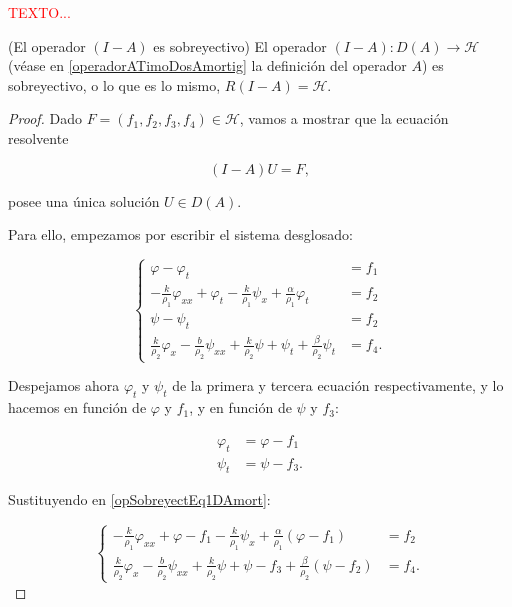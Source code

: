 \textcolor{red}{TEXTO...}

\begin{Proposicion}{(El operador $(I - A)$ es sobreyectivo)}
\label{ch:TimoshenkoFric:prop:ResolventeEsSobreyect}
    El operador $(I-A) : D(A) \rightarrow \mathcal{H}$ (véase en \eqref{operadorATimoDosAmortig} la definición del operador $A$) es sobreyectivo, o lo que es lo mismo, $R(I-A) = \mathcal{H}$.
\end{Proposicion}

\begin{proof}
    Dado $F = (f_1, f_2, f_3, f_4) \in \mathcal{H}$, vamos a mostrar que la ecuación resolvente

    \[(I-A)U = F,\]

    posee una única solución $U \in D(A)$.  

    Para ello, empezamos por escribir el sistema desglosado:

    \begin{equation}
        \label{opSobreyectEq1DAmort}
        \begin{cases}
            \varphi - \varphi_t &= f_1\\
            -\frac{k}{\rho_1}\varphi_{xx} + \varphi_t - \frac{k}{\rho_1}\psi_x + \frac{\alpha}{\rho_1}\varphi_t &= f_2\\
            \psi - \psi_t &= f_2\\
            \frac{k}{\rho_2}\varphi_x - \frac{b}{\rho_2}\psi_{xx} + \frac{k}{\rho_2}\psi + \psi_t + \frac{\beta}{\rho_2}\psi_t &= f_4.
        \end{cases}
    \end{equation}

    Despejamos ahora $\varphi_t$ y $\psi_t$ de la primera y tercera ecuación respectivamente, y lo hacemos en función de $\varphi$ y $f_1$, y en función de $\psi$ y $f_3$:

    \begin{align*}
        \varphi_t &= \varphi - f_1\\
        \psi_t &= \psi - f_3.
    \end{align*}

    Sustituyendo en \eqref{opSobreyectEq1DAmort}:

    \begin{equation*}
        \begin{cases}
            -\frac{k}{\rho_1}\varphi_{xx} + \varphi - f_1 - \frac{k}{\rho_1}\psi_x + \frac{\alpha}{\rho_1}(\varphi - f_1) &= f_2\\
            \frac{k}{\rho_2}\varphi_x - \frac{b}{\rho_2}\psi_{xx} + \frac{k}{\rho_2}\psi + \psi - f_3 + \frac{\beta}{\rho_2}(\psi - f_2) &= f_4.
        \end{cases}
    \end{equation*}


\end{proof}
